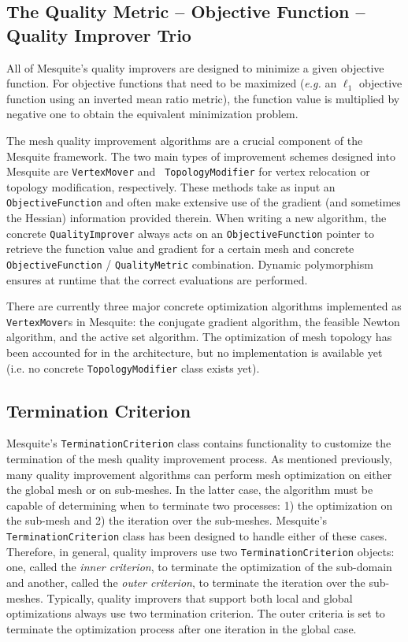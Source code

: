 \documentclass[letter]{report}
\begin{document}
\subsection{The Quality Metric -- Objective Function -- Quality Improver Trio} 
\label{sec:trio}



All of Mesquite's
quality improvers are designed to minimize a given objective function.
For objective functions that need to be maximized ({\it e.g.} an
$\ell_{1}$ objective function using an inverted mean ratio metric),
the function value is multiplied by negative one to obtain the
equivalent minimization problem.

The mesh quality improvement algorithms are a crucial component of the
Mesquite framework.  The two main types of improvement schemes
designed into Mesquite are {\tt VertexMover} and {\tt
TopologyModifier} for vertex relocation or topology modification,
respectively.  These methods take as input an {\tt ObjectiveFunction}
and often make extensive use of the gradient (and sometimes the
Hessian) information provided therein.  When writing a new algorithm,
the concrete \texttt{QualityImprover} always acts on an
\texttt{ObjectiveFunction} pointer to retrieve the function value and
gradient for a certain mesh and concrete \texttt{ObjectiveFunction} /
\texttt{QualityMetric} combination.  Dynamic polymorphism ensures at
runtime that the correct evaluations are performed.

There are currently three major concrete optimization 
algorithms implemented as {\tt VertexMover}s
in Mesquite: the conjugate gradient algorithm, the feasible Newton
algorithm, and the active set algorithm. The optimization of mesh
topology has been accounted for in the architecture, but no
implementation is available yet (i.e. no concrete
\texttt{TopologyModifier} class exists yet).


\subsection{Termination Criterion}
\label{termination_section}

Mesquite's \texttt{TerminationCriterion} class contains functionality
to customize the termination of the mesh quality improvement process.
As mentioned previously, many quality improvement algorithms can
perform mesh optimization on either the global mesh or on sub-meshes.
In the latter case, the algorithm must be capable of determining when
to terminate two processes: 1) the optimization on the sub-mesh and 2)
the iteration over the sub-meshes.  Mesquite's
\texttt{TerminationCriterion} class has been designed to handle either
of these cases.  Therefore, in general, quality improvers use two
\texttt{TerminationCriterion} objects: one, called the {\it inner
criterion}, to terminate the optimization of the sub-domain and
another, called the {\it outer criterion}, to terminate the iteration
over the sub-meshes.  Typically, quality improvers that support both
local and global optimizations always use two termination criterion. 
The outer criteria is set to terminate the optimization process after
one iteration in the global case.
\end{document}
